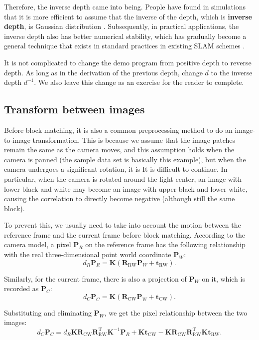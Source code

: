 Therefore, the inverse depth came into being. People have found in simulations that it is more efficient to assume that the inverse of the depth, which is \textbf{inverse depth}, is Gaussian distribution \textsuperscript{\cite{Civera2008}}. Subsequently, in practical applications, the inverse depth also has better numerical stability, which has gradually become a general technique that exists in standard practices in existing SLAM schemes \textsuperscript{\cite{Forster2014, Engel2014, Mur- Artal2015}}.

It is not complicated to change the demo program from positive depth to reverse depth. As long as in the derivation of the previous depth, change $ d $ to the inverse depth $ d ^{-1} $. We also leave this change as an exercise for the reader to complete.
\subsection{Transform between images}
Before block matching, it is also a common preprocessing method to do an image-to-image transformation. This is because we assume that the image patches remain the same as the camera moves, and this assumption holds when the camera is panned (the sample data set is basically this example), but when the camera undergoes a significant rotation, it is It is difficult to continue. In particular, when the camera is rotated around the light center, an image with lower black and white may become an image with upper black and lower white, causing the correlation to directly become negative (although still the same block).

To prevent this, we usually need to take into account the motion between the reference frame and the current frame before block matching. According to the camera model, a pixel $ \bm{P}_R $ on the reference frame has the following relationship with the real three-dimensional point world coordinate $ \bm{P}_W $:
\begin{equation}
d_R {\bm{P}_R}=\bm{K} \left( {{\bm{R}_{\mathrm{RW}}}{\bm{P}_W} + {\bm{t}_{\mathrm{RW}}}} \right).
\end{equation}

Similarly, for the current frame, there is also a projection of $ \bm{P}_W $ on it, which is recorded as $ \bm{P}_C $:
\begin{equation}
d_C {\bm{P}_C}=\bm{K} \left( {{\bm{R}_{\mathrm{CW}}}{\bm{P}_W} + {\bm{t}_{\mathrm{CW}}}} \right).
\end{equation}

Substituting and eliminating $ \bm{P}_W $, we get the pixel relationship between the two images:
\begin{equation}
d_C {\bm{P}_C}=d_R \bm{K} \bm{R}_{\mathrm{CW}} \bm{R}_{\mathrm{RW}}^\mathrm{T} \bm{K}^{-1} \bm{P}_R + \bm{K} \bm{t}_{\mathrm{CW}} - \bm{K} \bm{R}_{\mathrm{CW}} \bm{R}_{\mathrm{RW}}^\mathrm{T} \bm{K} \bm{t}_{\mathrm{RW}}.
\end{equation}

